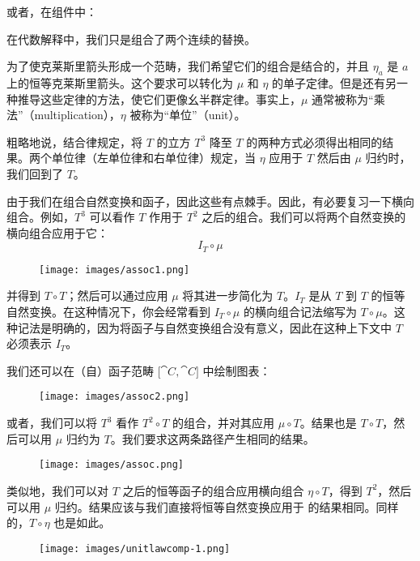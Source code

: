 或者，在组件中：

在代数解释中，我们只是组合了两个连续的替换。

为了使克莱斯里箭头形成一个范畴，我们希望它们的组合是结合的，并且 $\eta_a$ 是 $a$ 上的恒等克莱斯里箭头。这个要求可以转化为 $\mu$ 和 $\eta$ 的单子定律。但是还有另一种推导这些定律的方法，使它们更像幺半群定律。事实上，$\mu$ 通常被称为“乘法”（multiplication），$\eta$ 被称为“单位”（unit）。

粗略地说，结合律规定，将 $T$ 的立方 $T^3$ 降至 $T$ 的两种方式必须得出相同的结果。两个单位律（左单位律和右单位律）规定，当 $\eta$ 应用于 $T$ 然后由 $\mu$ 归约时，我们回到了 $T$。

由于我们在组合自然变换和函子，因此这些有点棘手。因此，有必要复习一下横向组合。例如，$T^3$ 可以看作 $T$ 作用于 $T^2$ 之后的组合。我们可以将两个自然变换的横向组合应用于它：
\[I_T \circ \mu\]

\begin{figure}[H]
  \centering
  \texttt{[image: images/assoc1.png]}
\end{figure}

\noindent
并得到 $T \circ T$；然后可以通过应用 $\mu$ 将其进一步简化为 $T$。$I_T$ 是从 $T$ 到 $T$ 的恒等自然变换。在这种情况下，你会经常看到 $I_T \circ \mu$ 的横向组合记法缩写为 $T \circ \mu$。这种记法是明确的，因为将函子与自然变换组合没有意义，因此在这种上下文中 $T$ 必须表示 $I_T$。

\noindent
我们还可以在（自）函子范畴 ${[}\cat{C}, \cat{C}{]}$ 中绘制图表：

\begin{figure}[H]
  \centering
  \texttt{[image: images/assoc2.png]}
\end{figure}

\noindent
或者，我们可以将 $T^3$ 看作 $T^2 \circ T$ 的组合，并对其应用 $\mu \circ T$。结果也是 $T \circ T$，然后可以用 $\mu$ 归约为 $T$。我们要求这两条路径产生相同的结果。

\begin{figure}[H]
  \centering
  \texttt{[image: images/assoc.png]}
\end{figure}

\noindent
类似地，我们可以对 $T$ 之后的恒等函子的组合应用横向组合 $\eta \circ T$，得到 $T^2$，然后可以用 $\mu$ 归约。结果应该与我们直接将恒等自然变换应用于  的结果相同。同样的，$T \circ \eta$ 也是如此。

\begin{figure}[H]
  \centering
  \texttt{[image: images/unitlawcomp-1.png]}
\end{figure}

